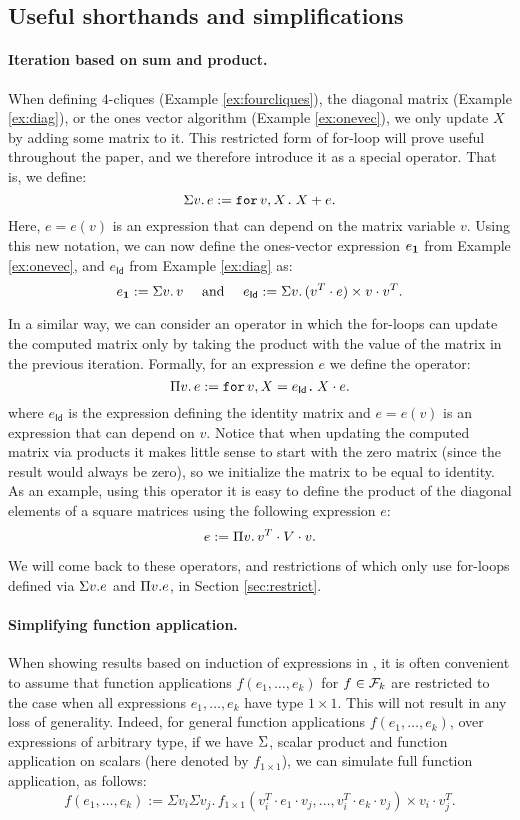 \subsection{Useful shorthands and simplifications}\label{sec:queries:simp}
\paragraph{Iteration based on sum and product.} When defining $4$-cliques (Example \ref{ex:fourcliques}), the diagonal matrix (Example \ref{ex:diag}), or the ones vector algorithm (Example \ref{ex:onevec}), we 
 only update $X$ by adding some matrix to it. This restricted form of for-loop will prove useful throughout the paper, and we therefore introduce it as a special operator. That is, we define:
$$\Sigma v. \, e := \texttt{for}\, v,X \texttt{.}\, X + e.$$
Here, $e=e(v)$ is an expression that can depend on the matrix variable $v$. 
Using this new notation, we can now define the ones-vector expression $e_{\mathbf{1}}$ from Example \ref{ex:onevec}, and $e_\mathsf{Id}$ from Example \ref{ex:diag} as:
\[ e_{\ones} := \Sigma v. \, v \ \ \ \text{ and } \ \ \ 
e_\mathsf{Id} := \Sigma v. \, (v^T\cdot e)\times v\cdot v^T.
\]

In a similar way, we can consider an operator in which the for-loops can update the computed matrix only by taking the product with the value of the matrix in the previous iteration. Formally, for an expression $e$ we define the operator:
$$
\Pi v.\,  e :=\texttt{for}\, v,X = e_{\mathsf{Id}} \texttt{.}\, X\cdot e.
$$
where $e_{\mathsf{Id}}$ is the expression defining the identity matrix and $e=e(v)$ is an expression that can depend on $v$. Notice that when updating the computed matrix via products it makes little sense to start with the zero matrix (since the result would always be zero), so we initialize the matrix to be equal to identity. 
As an example, using this operator it is easy to define the product of the diagonal elements of a square matrices using the following expression $e$:
$$
e := \Pi v. \, v^T\cdot V \cdot v.
$$

We will come back to these operators, and restrictions of \langfor which only use for-loops defined via $\Sigma v.e$ and $\Pi v.e$, in Section \ref{sec:restrict}.

\paragraph{Simplifying function application.} When showing results based on induction of expressions in \langfor, it is often convenient to assume that function applications $f(e_1,\ldots,e_k)$ for $f\in\mathcal{F}_k$ are restricted to
the case when all expressions $e_1,\ldots,e_k$ have type $1\times 1$. This will not result in any loss of generality. Indeed,
for general function applications $f(e_1,\ldots,e_k)$, over expressions of arbitrary type, if we have $\Sigma$, scalar product and function application on scalars (here denoted by $f_{1\times 1}$), we can simulate full function application, as follows:
 $$
f(e_1,\ldots, e_k) :=\Sigma v_i \Sigma v_j. \, f_{1\times 1}(v_i^T\cdot e_1\cdot v_j, \ldots ,v_i^T\cdot e_k\cdot v_j) \times v_i\cdot v_j^T.
$$

